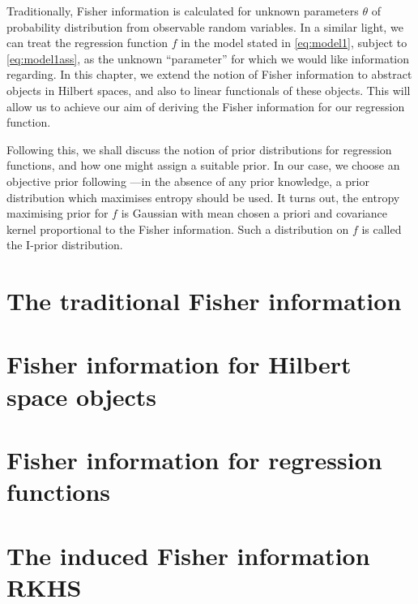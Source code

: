 \documentclass[a4paper,showframe,11pt]{report}
\begin{document}

Traditionally, Fisher information is calculated for unknown parameters $\theta$ of probability distribution from observable random variables.
In a similar light, we can treat the regression function $f$ in the model stated in \cref{eq:model1}, subject to \cref{eq:model1ass}, as the unknown ``parameter'' for which we would like information regarding.
In this chapter, we extend the notion of Fisher information to abstract objects in Hilbert spaces, and also to linear functionals of these objects.
This will allow us to achieve our aim of deriving the Fisher information for our regression function.

Following this, we shall discuss the notion of prior distributions for regression functions, and how one might assign a suitable prior.
In our case, we choose an objective prior following \citep{jaynes1957a,jaynes1957b}---in the absence of any prior knowledge, a prior distribution which maximises entropy should be used.
It turns out, the entropy maximising prior for $f$ is Gaussian with mean chosen a priori and covariance kernel proportional to the Fisher information.
Such a distribution on $f$ is called the I-prior distribution.

\section{The traditional Fisher information}


\section{Fisher information for Hilbert space objects}

%

\section{Fisher information for regression functions}


\section{The induced Fisher information RKHS}
\label{sec:inducedFisherRKHS}

\end{document}
